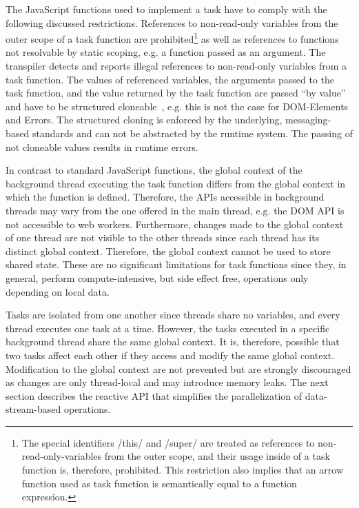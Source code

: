 The JavaScript functions used to implement a task have to comply with the following discussed restrictions. References to non-read-only variables from the outer scope of a task function are prohibited\footnote{The special identifiers \javascriptinline/this/ and \javascriptinline/super/ are treated as references to non-read-only-variables from the outer scope, and their usage inside of a task function is, therefore, prohibited. This restriction also implies that an arrow function used as task function is semantically equal to a function expression.} as well as references to functions not resolvable by static scoping, e.g. a function passed as an argument.  The transpiler detects and reports illegal references to non-read-only variables from a task function. The values of referenced variables, the arguments passed to the task function, and the value returned by the task function are passed \enquote{by value} and have to be structured cloneable~\cite[Section 2.9.4]{WHATWG2016}, e.g. this is not the case for DOM-Elements and Errors. The structured cloning is enforced by the underlying, messaging-based standards and can not be abstracted by the runtime system. The passing of not cloneable values results in runtime errors.

In contrast to standard JavaScript functions, the global context of the background thread executing the task function differs from the global context in which the function is defined. Therefore, the APIs accessible in background threads may vary from the one offered in the main thread, e.g. the DOM API is not accessible to web workers. Furthermore, changes made to the global context of one thread are not visible to the other threads since each thread has its distinct global context. Therefore, the global context cannot be used to store shared state. These are no significant limitations for task functions since they, in general, perform compute-intensive, but side effect free, operations only depending on local data.

Tasks are isolated from one another since threads share no variables, and every thread executes one task at a time. However, the tasks executed in a specific background thread share the same global context. It is, therefore, possible that two tasks affect each other if they access and modify the same global context. Modification to the global context are not prevented but are strongly discouraged as changes are only thread-local and may introduce memory leaks. The next section describes the reactive API that simplifies the parallelization of data-stream-based operations.


